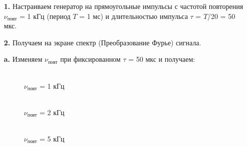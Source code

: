 \documentclass[a4paper,12pt]{article}
\begin{document}
\begin{enumerate}
\item [\textbf{1.}] Настраиваем генератор на прямоугольные импульсы с частотой повторения $\nu_\text{повт}$ = 1 кГц (период $T$ = 1 мс) и длительностью импульса $\tau$ = $T$/20 = 50 мкс.

\item [\textbf{2.}] Получаем на экране спектр (Преобразование Фурье) сигнала.

\textbf{a.} Изменяем $\nu_\text{повт}$ при фиксированном $\tau$ = 50 мкс и получаем:

\begin{figure}[h]
\begin{minipage}[h]{0.47\linewidth}
 \\ $\nu_\text{повт}$ = 1 кГц
\end{minipage}
\hfill
\begin{minipage}[h]{0.47\linewidth}
 \\ $\nu_\text{повт}$ = 2 кГц
\end{minipage}
\vfill
\begin{minipage}[h]{0.47\linewidth}
 \\ $\nu_\text{повт}$ = 5 кГц

\end{minipage}
\end{figure}
\end{enumerate}
\end{document}
